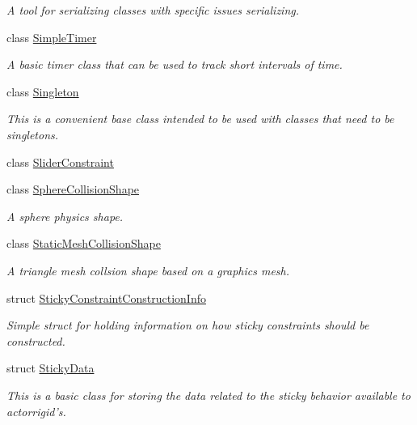 \begin{DoxyCompactItemize}
\begin{DoxyCompactList}\small\item\em A tool for serializing classes with specific issues serializing. \item\end{DoxyCompactList}\item 
class \hyperlink{classMezzanine_1_1SimpleTimer}{SimpleTimer}
\begin{DoxyCompactList}\small\item\em A basic timer class that can be used to track short intervals of time. \item\end{DoxyCompactList}\item 
class \hyperlink{classMezzanine_1_1Singleton}{Singleton}
\begin{DoxyCompactList}\small\item\em This is a convenient base class intended to be used with classes that need to be singletons. \item\end{DoxyCompactList}\item 
class \hyperlink{classMezzanine_1_1SliderConstraint}{SliderConstraint}
\item 
class \hyperlink{classMezzanine_1_1SphereCollisionShape}{SphereCollisionShape}
\begin{DoxyCompactList}\small\item\em A sphere physics shape. \item\end{DoxyCompactList}\item 
class \hyperlink{classMezzanine_1_1StaticMeshCollisionShape}{StaticMeshCollisionShape}
\begin{DoxyCompactList}\small\item\em A triangle mesh collsion shape based on a graphics mesh. \item\end{DoxyCompactList}\item 
struct \hyperlink{structMezzanine_1_1StickyConstraintConstructionInfo}{StickyConstraintConstructionInfo}
\begin{DoxyCompactList}\small\item\em Simple struct for holding information on how sticky constraints should be constructed. \item\end{DoxyCompactList}\item 
struct \hyperlink{structMezzanine_1_1StickyData}{StickyData}
\begin{DoxyCompactList}\small\item\em This is a basic class for storing the data related to the sticky behavior available to actorrigid's. \item\end{DoxyCompactList}\item 

\end{DoxyCompactItemize}
